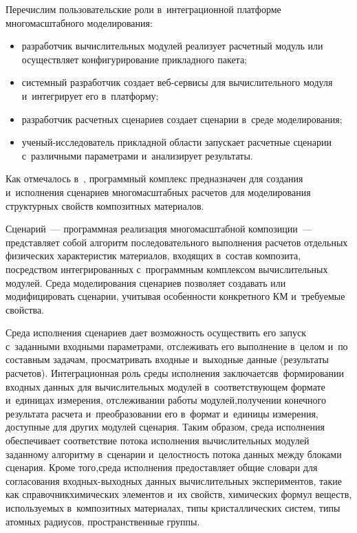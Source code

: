 \begin{multicols}{2}
   Перечислим пользовательские роли в~интеграционной плат\-фор\-ме 
мно\-го\-мас\-штаб\-но\-го моделирования:
   \begin{itemize}
\item разработчик вычислительных модулей реализует расчетный модуль или 
осуществляет конфигурирование при\-клад\-но\-го па\-кета;\\[-15pt]
\item системный разработчик создает веб-сер\-ви\-сы для вы\-чис\-ли\-тель\-но\-го модуля 
и~интегрирует его в~плат\-форму;\\[-15pt]
\item разработчик расчетных сценариев создает сценарии в~среде моделирования;\\[-15pt]
\item ученый-исследователь прикладной об\-ласти запускает расчетные сценарии 
с~различными па\-ра\-мет\-ра\-ми и~анализирует ре\-зуль\-таты.
\end{itemize}
    
    Как отмечалось в~\cite{5-ab, 6-ab}, программный комплекс предназначен для 
создания и~исполнения сценариев многомасштабных расчетов для моделирования 
структурных свойств композитных материалов.
    
    Сценарий~--- программная реализация мно\-го\-мас\-штаб\-ной композиции~--- 
пред\-став\-ля\-ет собой алгоритм последовательного выполнения расчетов отдельных 
физических характеристик материалов, входящих в~со\-став композита, 
посредством интегрированных с~программным комплексом вы\-чис\-ли\-тель\-ных 
модулей. Среда моделирования сценариев поз\-во\-ля\-ет создавать или 
модифицировать сценарии, учитывая особенности конкретного 
КМ и~тре\-бу\-емые свойства.



 
    
    Среда исполнения сценариев дает возможность осуществить его запуск 
    с~заданными входными па\-ра\-мет\-ра\-ми, отслеживать его выполнение в~целом и~по 
со\-став\-ным задачам, про\-смат\-ри\-вать входные и~выходные данные (результаты 
расчетов). Интеграционная роль среды исполнения заключается\linebreak в~формировании 
входных данных для вычислительных модулей в~со\-от\-вет\-ст\-ву\-ющем формате 
и~единицах измерения, отслеживании работы модулей,\linebreak получении конечного 
результата расчета и~преобразовании его в~формат и~единицы измерения, 
до\-ступ\-ные для других модулей сценария. Таким образом, среда исполнения 
обеспечивает соответствие потока исполнения вы\-чис\-ли\-тель\-ных модулей 
заданному алгоритму в~сценарии и~це\-лост\-ность потока данных между блоками 
сценария. Кроме того,\linebreak среда исполнения предостав\-ля\-ет общие словари для\linebreak 
согласования вход\-ных-вы\-ход\-ных данных вы\-чис\-ли\-тель\-ных экспериментов, 
такие как справочник\linebreak химических элементов и~их свойств, химических формул 
веществ, ис\-поль\-зу\-емых в~композитных материалах, типы крис\-тал\-ли\-че\-ских 
сис\-тем, типы атомных радиусов, пространственные группы.


\end{multicols}
